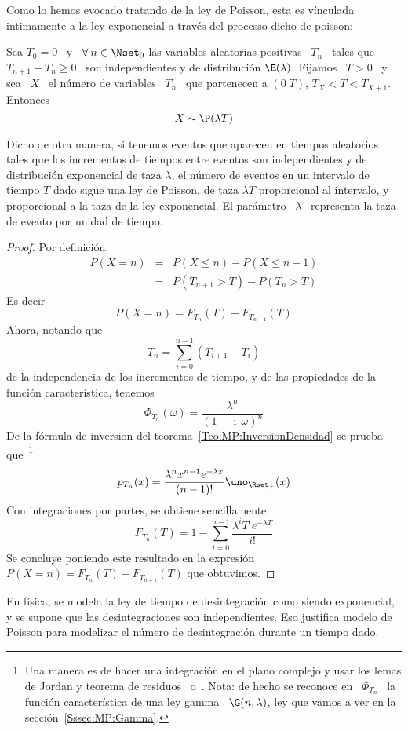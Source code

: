 Como  lo hemos  evocado  tratando de  la  ley de  Poisson,  esta es  v\'inculada
intimamente a la ley exponencial a trav\'es del processo dicho de poisson:
%
\begin{lema}
\label{Lem:MP:VinculoExponencialPoisson}
%
  Sea  $T_0 =  0$ \  y \  $\forall \:  n \in  \Nset_0$ las  variables aleatorias
  positivas \ $T_n$ \ tales que $T_{n+1}  - T_n \ge 0$ \ son independientes y de
  distribuci\'on $\E(\lambda)$. Fijamos \ $T > 0$ \ y sea \ $X$ \ el n\'umero de
  variables  \  $T_n$  \  que  partenecen  a   $(0  \;  T)$,  \ie  $T_X  <  T  <
  T_{X+1}$. Entonces
  \[
  X \sim \P(\lambda T)
  \]
\end{lema}
%
Dicho  de otra manera,  si tenemos  eventos que  aparecen en  tiempos aleatorios
tales  que los  incrementos de  tiempos entre  eventos son  independientes  y de
distribuci\'on  exponencial de  taza $\lambda$,  el  n\'umero de  eventos en  un
intervalo  de tiempo $T$  dado sigue  una ley  de Poisson,  de taza  $\lambda T$
proporcional al  intervalo, y proporcional a  la taza de la  ley exponencial. El
par\'ametro \ $\lambda$ \ representa la taza de evento por unidad de tiempo.
%
\begin{proof}
Por definici\'on,
%
\begin{eqnarray*}
P(X = n) & = & P(X\le n) - P(X \le n-1) \\[2mm]
%
& = & P(T_{n+1} > T) - P(T_n > T)
\end{eqnarray*}
%
Es decir
%
\[
P(X = n) = F_{T_n}(T) - F_{T_{n+1}}(T)
\]
%
Ahora, notando que
%
\[
T_n = \sum_{i=0}^{n-1} \left( T_{i+1} - T_i \right)
\]
%
de la  independencia de los  incrementos de tiempo,  y de las propiedades  de la
funci\'on caracter\'istica, tenemos
%
\[
\Phi_{T_n}(\omega) = \frac{\lambda^n}{(1-\imath \, \omega)^n}
\]
%
De  la  f\'ormula  de  inversion del  teorema~\ref{Teo:MP:InversionDensidad}  se
prueba  que~\footnote{Una manera  es  de  hacer una  integraci\'on  en el  plano
  complejo  y usar  los lemas  de Jordan  y teorema  de residuos~\cite{CarKro05}
  o~\cite[Cap.~4]{AblFok03}.  Nota: de hecho se  reconoce en \ $\Phi_{T_n}$ \ la
  funci\'on caracter\'istica de una ley gamma \ $\G(n,\lambda)$, ley que vamos a
  ver en la secci\'on~\ref{Sssec:MP:Gamma}.}
%
\[
p_{T_n}(x) = \frac{\lambda^n x^{n-1} e^{-\lambda x}}{(n-1)!} \uno_{\Rset_+}(x)
\]
%
Con integraciones por partes, se obtiene sencillamente
%
\[
F_{T_n}(T) = 1 - \sum_{i=0}^{n-1} \frac{\lambda^i T^i e^{-\lambda T}}{i!}
\]
%
Se concluye poniendo  este resultado en la expresi\'on $P(X =  n) = F_{T_n}(T) -
F_{T_{n+1}}(T)$ que obtuvimos.
\end{proof}
%
En  f\'isica,  se  modela la  ley  de  tiempo  de desintegraci\'on  como  siendo
exponencial,  y  se supone  que  las  desintegraciones  son independientes.  Eso
justifica  modelo de  Poisson  para modelizar  el  n\'umero de  desintegraci\'on
durante un tiempo dado.

